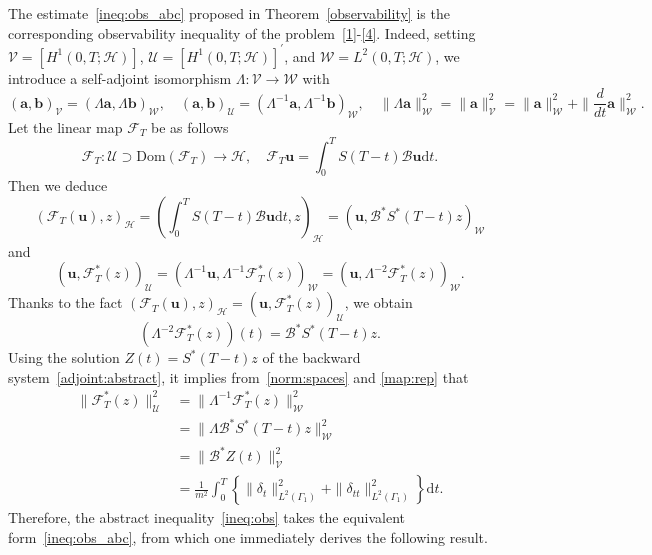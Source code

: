 \documentclass[10pt]{elsarticle}
\begin{document}
The estimate~\eqref{ineq:obs_abc} proposed in Theorem~\ref{observability} is the corresponding observability inequality of the problem~\eqref{1}-\eqref{4}. Indeed, setting $\mathcal{V} = \left[H^{1}(0, T; \mathcal{H})\right]$, $\mathcal{U} = \left[H^{1}(0, T; \mathcal{H})\right]^{\prime}$,  and $\mathcal{W}=L^2(0, T; \mathcal{H})$, we introduce a self-adjoint isomorphism $\Lambda: \mathcal{V}\rightarrow\mathcal{W}$ with
\begin{equation}\label{norm:spaces}
(\mathbf{ a}, \mathbf{ b})_{\mathcal{V}} = (\Lambda\mathbf{ a}, \Lambda\mathbf{ b} )_{\mathcal{W}}, \quad (\mathbf{ a}, \mathbf{ b})_{\mathcal{U}} = (\Lambda^{-1}\mathbf{ a}, \Lambda^{-1}\mathbf{ b} )_{\mathcal{W}}, \quad \|\Lambda\mathbf{ a}\|^2_{\mathcal{W}} = \|\mathbf{ a}\|^2_{\mathcal{V}} = \|\mathbf{ a}\|^2_{\mathcal{W}} + \|\frac{d}{dt}\mathbf{ a}\|^2_{\mathcal{W}}.
\end{equation}
Let the linear map $\mathcal{F}_{T}$ be as follows
\begin{equation}\label{linear_map}
	\mathcal{F}_{T}: \mathcal{U}\supset \mathrm{Dom}(\mathcal{F}_T) \rightarrow \mathcal{H}, \quad \mathcal{F}_{T}\mathbf{u}=\int_{0}^{T}S(T-t)\mathcal{B}\mathbf{u}\mathrm{d}t.
\end{equation}
Then we deduce
\[
(\mathcal{F}_{T}(\mathbf{u}), z)_{\mathcal{H}} = (\int_{0}^{T}S(T-t)\mathcal{B}\mathbf{u}\mathrm{d}t, z)_{\mathcal{H}} = (\mathbf{u}, \mathcal{B}^{\ast}S^{\ast}(T-t)z)_{\mathcal{W}}
\]
and
\begin{equation*}
	(\mathbf{u}, \mathcal{F}^{\ast}_{T}(z))_{\mathcal{U}} = (\Lambda^{-1}\mathbf{u}, \Lambda^{-1}\mathcal{F}^{\ast}_{T}(z) )_{\mathcal{W}} = (\mathbf{u}, \Lambda^{-2}\mathcal{F}^{\ast}_{T}(z) )_{\mathcal{W}}.
\end{equation*}
Thanks to the fact $(\mathcal{F}_{T}(\mathbf{u}), z)_{\mathcal{H}}=(\mathbf{u}, \mathcal{F}^{\ast}_{T}(z))_{\mathcal{U}}$, we obtain
\begin{equation}\label{map:rep}
\left(\Lambda^{-2}\mathcal{F}^{\ast}_{T}(z)\right)(t) = \mathcal{B}^{\ast}S^{\ast}(T-t)z.
\end{equation}
Using the solution $Z(t) = S^{\ast}(T-t)z$ of the backward system~\eqref{adjoint:abstract}, it implies from~\eqref{norm:spaces} and \eqref{map:rep} that
\begin{equation*}
\begin{split}
\|\mathcal{F}^{\ast}_{T}(z)\|^2_{\mathcal{U}} &= \|\Lambda^{-1}\mathcal{F}^{\ast}_{T}(z)\|^2_{\mathcal{W}}\\
& = \|\Lambda \mathcal{B}^{\ast}S^{\ast}(T-t)z\|^2_{\mathcal{W}}\\
& = \|\mathcal{B}^{\ast}Z(t) \|^2_{\mathcal{V}} \\
&= \frac{1}{m^2}\int_{0}^{T}\left\{ \|\delta_t\|^2_{L^2(\Gamma_1)}+\|\delta_{tt}\|^2_{L^2(\Gamma_1)}\right\}\mathrm{d}t.
\end{split}
\end{equation*}
Therefore, the abstract inequality~\eqref{ineq:obs} takes the equivalent form~\eqref{ineq:obs_abc}, from which one immediately derives the following result.
\end{document}
